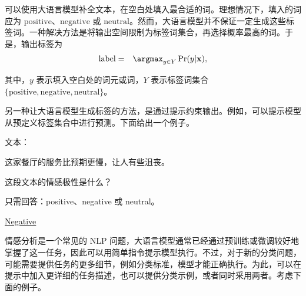 \noindent 可以使用大语言模型补全文本，在空白处填入最合适的词。理想情况下，填入的词应为 $\mathrm{positive}$、$\mathrm{negative}$ 或 $\mathrm{neutral}$。然而，大语言模型并不保证一定生成这些标签词。一种解决方法是将输出空间限制为标签词集合，再选择概率最高的词。于是，输出标签为
\begin{eqnarray}
\mathrm{label} & = & \argmax_{y \in Y} \Pr(y|\mathbf{x}),
\end{eqnarray}

\noindent 其中，$y$ 表示填入空白处的词元或词，$Y$ 表示标签词集合\\ $\{\mathrm{positive}, \mathrm{negative}, \mathrm{neutral}\}$。

另一种让大语言模型生成标签的方法，是通过提示约束输出。例如，可以提示模型从预定义标签集合中进行预测。下面给出一个例子。

\vspace{0.5em}
\begin{tcolorbox}

\begingroup
\setlength{\leftskip}{2em}
\setlength{\rightskip}{2em}


\vspace{0.7em}

文本：

这家餐厅的服务比预期更慢，让人有些沮丧。

\vspace{0.7em}

这段文本的情感极性是什么？

\vspace{0.3em}

只需回答：positive、negative 或 neutral。

\vspace{0.7em}

\underline{Negative}

\endgroup

\end{tcolorbox}
\vspace{0.5em}

情感分析是一个常见的 NLP 问题，大语言模型通常已经通过预训练或微调较好地掌握了这一任务，因此可以用简单指令提示模型执行。不过，对于新的分类问题，可能需要提供任务的更多细节，例如分类标准，模型才能正确执行。为此，可以在提示中加入更详细的任务描述，也可以提供分类示例，或者同时采用两者。考虑下面的例子。

